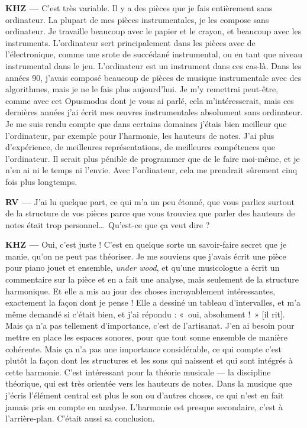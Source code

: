 \documentclass[a4paper,12pt]{article}
\newcommand{\guill}[1]{«~#1~»}
\begin{document}
\textbf{KHZ ---} C'est très variable. Il y a des pièces que je fais entièrement sans ordinateur. La plupart de mes pièces instrumentales, je les compose sans ordinateur. Je travaille beaucoup avec le papier et le crayon, et beaucoup avec les instruments. L'ordinateur sert principalement dans les pièces avec de l'électronique, comme une srote de succédané instrumental, ou en tant que niveau instrumental dans le jeu. L'ordinateur est un instrument dans ces cas-là. Dans les années 90, j'avais composé beaucoup de pièces de musique instrumentale avec des algorithmes, mais je ne le fais plus aujourd'hui. Je m'y remettrai peut-être, comme avec cet Opusmodus dont je vous ai parlé, cela m'intéresserait, mais ces dernières années j'ai écrit mes œuvres instrumentales absolument sans ordinateur. Je me suis rendu compte que dans certains domaines j'étais bien meilleur que l'ordinateur, par exemple pour l'harmonie, les hauteurs de notes. J'ai plus d'expérience, de meilleures représentations, de meilleures compétences que l'ordinateur. Il serait plus pénible de programmer que de le faire moi-même, et je n'en ai ni le temps ni l'envie. Avec l'ordinateur, cela me prendrait sûrement cinq fois plus longtemps.

\textbf{RV ---} J'ai lu quelque part, ce qui m'a un peu étonné, que vous parliez surtout de la structure de vos pièces parce que vous trouviez que parler des hauteurs de notes était trop personnel\dots~Qu'est-ce que ça veut dire ?

\textbf{KHZ ---} Oui, c'est juste ! C'est en quelque sorte un savoir-faire secret que je manie, qu'on ne peut pas théoriser. Je me souviens que j'avais écrit une pièce pour piano jouet et ensemble, \emph{under wood}, et qu'une musicologue a écrit un commentaire sur la pièce et en a fait une analyse, mais seulement de la structure harmonique. Et elle a mis au jour des choses incroyablement intéressantes, exactement la façon dont je pense ! Elle a dessiné un tableau d'intervalles, et m'a même demandé si c'était bien, et j'ai répondu : \guill{oui, absolument !} [il rit]. Mais ça n'a pas tellement d'importance, c'est de l'artisanat. J'en ai besoin pour mettre en place les espaces sonores, pour que tout sonne ensemble de manière cohérente. Mais ça n'a pas une importance considérable, ce qui compte c'est plutôt la façon dont les structures et les sons qui naissent et qui sont intégrés à cette harmonie. C'est intéressant pour la théorie musicale --- la discipline théorique, qui est très orientée vers les hauteurs de notes. Dans la musique que j'écris l'élément central est plus le son ou d'autres choses, ce qui n'est en fait jamais pris en compte en analyse. L'harmonie est presque secondaire, c'est à l'arrière-plan. C'était aussi sa conclusion.
\end{document}

